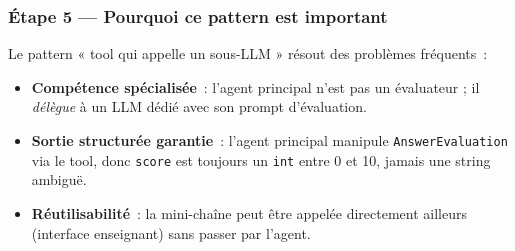 \documentclass[11pt,a4paper]{article}
\begin{document}
\subsubsection*{Étape 5 — Pourquoi ce pattern est important}

Le pattern « tool qui appelle un sous-LLM » résout des problèmes
fréquents~:

\begin{itemize}[leftmargin=*]
  \item \textbf{Compétence spécialisée}~: l'agent principal n'est pas un
        évaluateur ; il \emph{délègue} à un LLM dédié avec son prompt
        d'évaluation.
  \item \textbf{Sortie structurée garantie}~: l'agent principal manipule
        \texttt{AnswerEvaluation} via le tool, donc \texttt{score} est
        toujours un \texttt{int} entre 0 et 10, jamais une string
        ambiguë.
  \item \textbf{Réutilisabilité}~: la mini-chaîne peut être appelée
        directement ailleurs (interface enseignant) sans passer par
        l'agent.
\end{itemize}
\end{document}
